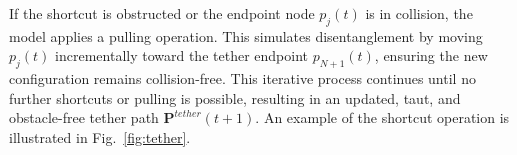 




If the shortcut is obstructed or the endpoint node \( p_j(t) \) is in collision, the model applies a pulling operation. This simulates disentanglement by moving \( p_j(t) \) incrementally toward the tether endpoint \( p_{N+1}(t) \), ensuring the new configuration remains collision-free. This iterative process continues until no further shortcuts or pulling is possible, resulting in an updated, taut, and obstacle-free tether path \( \mathbf{P}^{tether}(t+1) \). An example of the shortcut operation is illustrated in Fig.~\ref{fig:tether}.


